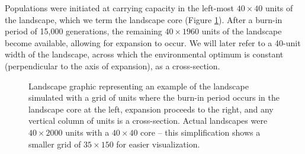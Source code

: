 Populations were initiated at carrying capacity in the left-most $40\times40$ units of the landscape, which we term the landscape core (Figure \ref{fig:landscape}). After a burn-in period of 15,000 generations, the remaining $40\times1960$ units of the landscape become available, allowing for expansion to occur. We will later refer to a 40-unit width of the landscape, across which the environmental optimum is constant (perpendicular to the axis of expansion), as a cross-section.

\begin{figure}[h]
\centering
{}
\caption[Landscape graphic.]{Landscape graphic representing an example of the landscape simulated with a grid of units where the burn-in period occurs in the landscape core at the left, expansion proceeds to the right, and any vertical column of units is a cross-section. Actual landscapes were $40\times2000$ units with a $40\times40$ core -- this simplification shows a smaller grid of $35\times150$ for easier visualization.}
\label{fig:landscape}
\end{figure}

